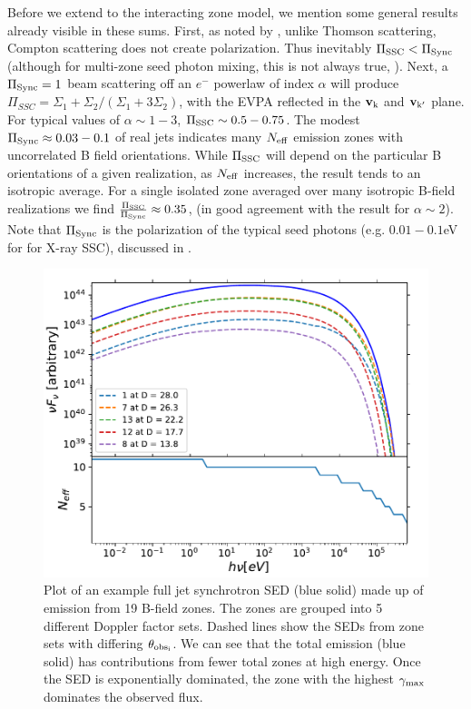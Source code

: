 Before we extend to the interacting zone model, we mention some general results already visible in these sums. First, as noted by \citet{bonometto_polarization_1970}, unlike Thomson scattering, Compton scattering does not create polarization. Thus inevitably $\Pi_{\rm SSC} < \Pi_{\rm Sync}$ (although for multi-zone seed photon mixing, this is not always true, ). Next, a $\Pi_{\rm Sync}=1$ beam scattering off an $e^-$ powerlaw of index $\alpha$ will produce $\Pi_{SSC} = \Sigma_1 + \Sigma_2 / (\Sigma_1 + 3\Sigma_2)$, with the EVPA reflected in the $\mathbf{v_{\rm k}}$ and $\mathbf{v_{\rm k'}}$ plane. For typical values of $\alpha \sim 1-3$, $\Pi_{\rm SSC} \sim 0.5-0.75$. The modest $\Pi_{\rm Sync} \approx 0.03-0.1$ of real jets indicates many $N_{\rm eff}$ emission zones with uncorrelated B field orientations. While $\Pi_{\rm SSC}$ will depend on the particular B orientations of a given realization, as $N_{\rm eff}$ increases, the result tends to an isotropic average. For a single isolated zone averaged over many isotropic B-field realizations we find $\frac{\Pi_{\rm SSC}}{\Pi_{\rm Sync}} \approx 0.35$, %
(in good agreement with the \citet{bonometto_polarization_1973} result for $\alpha \sim 2$). Note that $\Pi_{\rm Sync}$ is the polarization of the typical seed photons (e.g. $0.01-0.1$eV for for X-ray SSC), discussed in .


\begin{figure}[t]
\includegraphics[width=0.8\linewidth]{figures/Figure3.pdf}
\centering
\caption{Plot of an example full jet synchrotron SED (blue solid) made up of emission from 19 B-field zones. The zones are grouped into 5 different Doppler factor sets. Dashed lines show the SEDs from zone sets with differing $\theta_{\rm obs_i}$. We can see that the total emission (blue solid) has contributions from fewer total zones at high energy. Once the SED is exponentially dominated, the zone with the highest $\gamma_{\rm max}$ dominates the observed flux.}
\label{fig:ssc3}
\end{figure}


